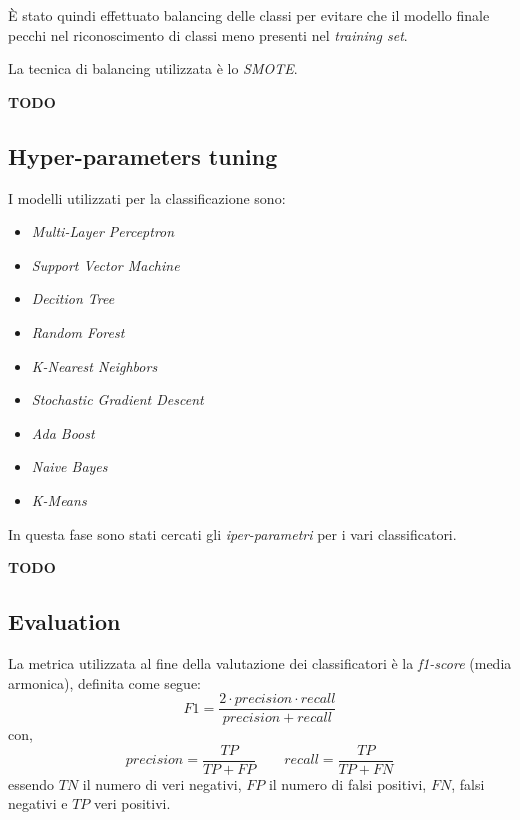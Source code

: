                         \`E stato quindi effettuato balancing delle classi per evitare che il modello finale pecchi nel riconoscimento di classi meno presenti nel \textit{training set}.
                        
                        La tecnica di balancing utilizzata è lo \textit{SMOTE}.
                        
                        \textbf{TODO}
                

        \subsection{Hyper-parameters tuning}
        
                I modelli utilizzati per la classificazione sono:
                \begin{itemize}
                        \item \textit{Multi-Layer Perceptron}
                        \item \textit{Support Vector Machine}
                        \item \textit{Decition Tree}
                        \item \textit{Random Forest}
                        \item \textit{K-Nearest Neighbors}
                        \item \textit{Stochastic Gradient Descent}
                        \item \textit{Ada Boost}
                        \item \textit{Naive Bayes}
                        \item \textit{K-Means}
                \end{itemize}
            
                In questa fase sono stati cercati gli \textit{iper-parametri} per i vari classificatori.
                
                \textbf{TODO}
                

        \subsection{Evaluation}
        
                La metrica utilizzata al fine della valutazione dei classificatori è la \textit{f1-score} (media armonica), definita come segue:
                \begin{displaymath}
                F1 = \frac{2 \cdot precision \cdot recall}{precision + recall}
                \end{displaymath}
                con,
                \begin{displaymath}
                precision = \frac{TP}{TP + FP} \qquad recall = \frac{TP}{TP + FN}
                \end{displaymath}
                essendo $TN$ il numero di veri negativi, $FP$ il numero di falsi positivi, $FN$, falsi negativi e $TP$ veri positivi.
